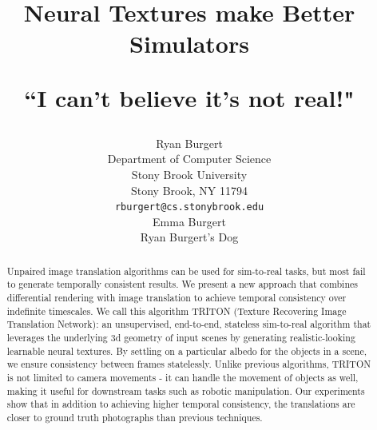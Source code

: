 \documentclass{article}
\title{Neural Textures make Better Simulators

``I can't believe it's not real!" %
 }
\author{%
	Ryan Burgert \\
	Department of Computer Science\\
	Stony Brook University\\
	Stony Brook, NY 11794 \\
	\texttt{rburgert@cs.stonybrook.edu} \\
	\And
	Emma Burgert \\
	Ryan Burgert's Dog\\
}
\begin{document}
\maketitle


\begin{abstract}


	Unpaired image translation algorithms can be used for sim-to-real tasks, but most fail to generate temporally consistent results.
	We present a new approach that combines differential rendering with image translation to achieve temporal consistency over indefinite timescales.
%
	We call this algorithm TRITON (Texture Recovering Image Translation Network): an unsupervised, end-to-end, stateless sim-to-real algorithm that 
	leverages the underlying 3d geometry of input scenes by generating realistic-looking learnable neural textures.
%
	By settling on a particular albedo for the objects in a scene, we ensure consistency between frames statelessly.
	Unlike previous algorithms, TRITON is not limited to camera movements - it can handle the movement of objects as well, making it useful for downstream tasks such as robotic manipulation.
	Our experiments show that in addition to achieving higher temporal consistency, the translations are closer to ground truth photographs than previous techniques.

\end{abstract}

\end{document}
